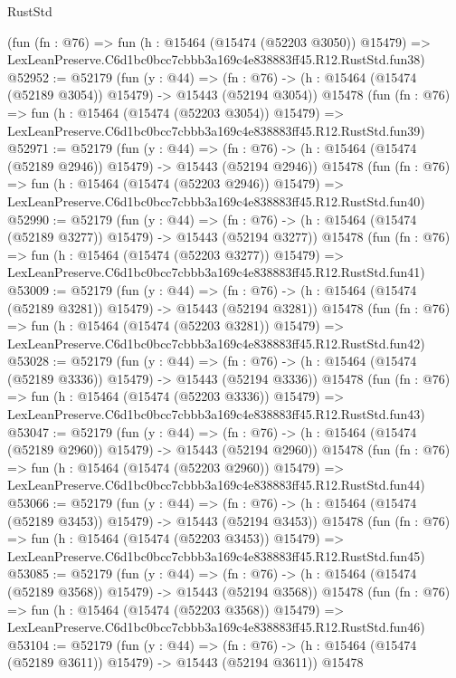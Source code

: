 \begin{lexlean}{RustStd}
\begin{coremodule}
    (fun (fn : @76) =>
    fun (h : @15464 (@15474 (@52203 @3050)) @15479) =>
    LexLeanPreserve.C6d1bc0bcc7cbbb3a169c4e838883ff45.R12.RustStd.fun38)
@52952 := @52179
    (fun (y : @44) =>
    (fn : @76) -> (h : @15464 (@15474 (@52189 @3054)) @15479) -> @15443 (@52194 @3054))
    @15478
    (fun (fn : @76) =>
    fun (h : @15464 (@15474 (@52203 @3054)) @15479) =>
    LexLeanPreserve.C6d1bc0bcc7cbbb3a169c4e838883ff45.R12.RustStd.fun39)
@52971 := @52179
    (fun (y : @44) =>
    (fn : @76) -> (h : @15464 (@15474 (@52189 @2946)) @15479) -> @15443 (@52194 @2946))
    @15478
    (fun (fn : @76) =>
    fun (h : @15464 (@15474 (@52203 @2946)) @15479) =>
    LexLeanPreserve.C6d1bc0bcc7cbbb3a169c4e838883ff45.R12.RustStd.fun40)
@52990 := @52179
    (fun (y : @44) =>
    (fn : @76) -> (h : @15464 (@15474 (@52189 @3277)) @15479) -> @15443 (@52194 @3277))
    @15478
    (fun (fn : @76) =>
    fun (h : @15464 (@15474 (@52203 @3277)) @15479) =>
    LexLeanPreserve.C6d1bc0bcc7cbbb3a169c4e838883ff45.R12.RustStd.fun41)
@53009 := @52179
    (fun (y : @44) =>
    (fn : @76) -> (h : @15464 (@15474 (@52189 @3281)) @15479) -> @15443 (@52194 @3281))
    @15478
    (fun (fn : @76) =>
    fun (h : @15464 (@15474 (@52203 @3281)) @15479) =>
    LexLeanPreserve.C6d1bc0bcc7cbbb3a169c4e838883ff45.R12.RustStd.fun42)
@53028 := @52179
    (fun (y : @44) =>
    (fn : @76) -> (h : @15464 (@15474 (@52189 @3336)) @15479) -> @15443 (@52194 @3336))
    @15478
    (fun (fn : @76) =>
    fun (h : @15464 (@15474 (@52203 @3336)) @15479) =>
    LexLeanPreserve.C6d1bc0bcc7cbbb3a169c4e838883ff45.R12.RustStd.fun43)
@53047 := @52179
    (fun (y : @44) =>
    (fn : @76) -> (h : @15464 (@15474 (@52189 @2960)) @15479) -> @15443 (@52194 @2960))
    @15478
    (fun (fn : @76) =>
    fun (h : @15464 (@15474 (@52203 @2960)) @15479) =>
    LexLeanPreserve.C6d1bc0bcc7cbbb3a169c4e838883ff45.R12.RustStd.fun44)
@53066 := @52179
    (fun (y : @44) =>
    (fn : @76) -> (h : @15464 (@15474 (@52189 @3453)) @15479) -> @15443 (@52194 @3453))
    @15478
    (fun (fn : @76) =>
    fun (h : @15464 (@15474 (@52203 @3453)) @15479) =>
    LexLeanPreserve.C6d1bc0bcc7cbbb3a169c4e838883ff45.R12.RustStd.fun45)
@53085 := @52179
    (fun (y : @44) =>
    (fn : @76) -> (h : @15464 (@15474 (@52189 @3568)) @15479) -> @15443 (@52194 @3568))
    @15478
    (fun (fn : @76) =>
    fun (h : @15464 (@15474 (@52203 @3568)) @15479) =>
    LexLeanPreserve.C6d1bc0bcc7cbbb3a169c4e838883ff45.R12.RustStd.fun46)
@53104 := @52179
    (fun (y : @44) =>
    (fn : @76) -> (h : @15464 (@15474 (@52189 @3611)) @15479) -> @15443 (@52194 @3611))
    @15478

\end{coremodule}
\end{lexlean}
